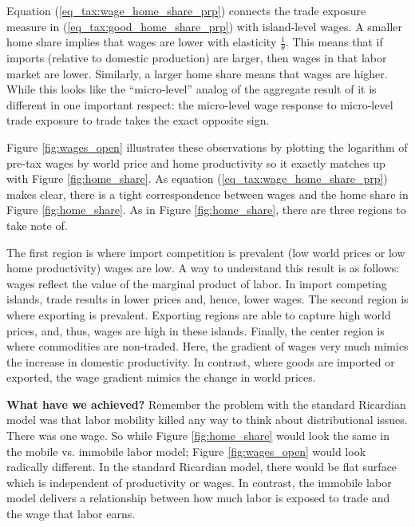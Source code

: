 \documentclass[pdftex,12pt]{article}
\begin{document}
\medskip
\noindent Equation (\ref{eq_tax:wage_home_share_prp}) connects the trade exposure measure in (\ref{eq_tax:good_home_share_prp}) with island-level wages. A smaller home share implies that wages are lower with elasticity $\frac{1}{\theta}$. This means that if imports (relative to domestic production) are larger, then wages in that labor market are lower. Similarly, a larger home share means that wages are higher. While this looks like the ``micro-level'' analog of the aggregate result of \citet{arkolakis2012new} it is different in one important respect: the micro-level wage response to micro-level trade exposure to trade takes the exact opposite sign.

\medskip
\noindent Figure \ref{fig:wages_open} illustrates these observations by plotting the logarithm of pre-tax wages by world price and home productivity so it exactly matches up with Figure \ref{fig:home_share}. As equation (\ref{eq_tax:wage_home_share_prp}) makes clear, there is a tight correspondence between wages and the home share in Figure \ref{fig:home_share}. As in Figure \ref{fig:home_share}, there are three regions to take note of.

\medskip
\noindent The first region is where import competition is prevalent (low world prices or low home productivity) wages are low. A way to understand this result is as follows: wages reflect the value of the marginal product of labor. In import competing islands, trade results in lower prices and, hence, lower wages. The second region is where exporting is prevalent. Exporting regions are able to capture high world prices, and, thus, wages are high in these islands. Finally, the center region is where commodities are non-traded. Here, the gradient of wages very much mimics the increase in domestic productivity. In contrast, where goods are imported or exported, the wage gradient mimics the change in world prices.

\medskip
\noindent \textbf{What have we achieved?} Remember the problem with the standard Ricardian model was that labor mobility killed any way to think about distributional issues. There was one wage. So while Figure \ref{fig:home_share} would look the same in the mobile vs. immobile labor model; Figure \ref{fig:wages_open} would look radically different. In the standard Ricardian model, there would be flat surface which is independent of productivity or wages. In contrast, the immobile labor model delivers a relationship between how much labor is exposed to trade and the wage that labor earns. 
\end{document}
